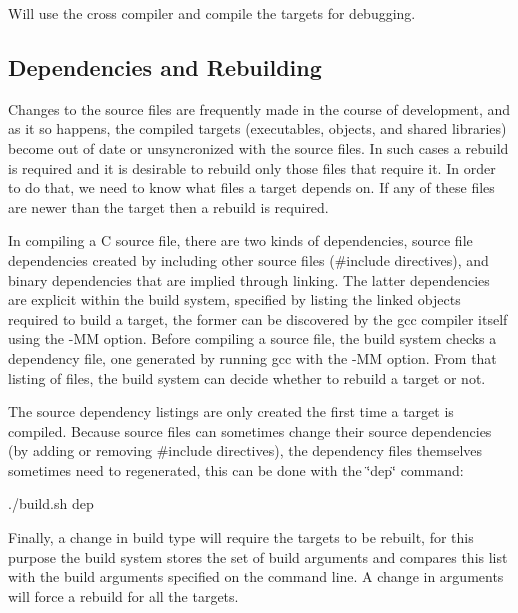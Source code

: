 Will use the cross compiler and compile the targets for debugging.

\subsection*{Dependencies and Rebuilding }

Changes to the source files are frequently made in the course of development, and as it so happens, the compiled targets (executables, objects, and shared libraries) become out of date or unsyncronized with the source files. In such cases a rebuild is required and it is desirable to rebuild only those files that require it. In order to do that, we need to know what files a target depends on. If any of these files are newer than the target then a rebuild is required.

In compiling a C source file, there are two kinds of dependencies, source file dependencies created by including other source files ({\ttfamily \#include} directives), and binary dependencies that are implied through linking. The latter dependencies are explicit within the build system, specified by listing the linked objects required to build a target, the former can be discovered by the gcc compiler itself using the {\ttfamily -\/\+MM} option. Before compiling a source file, the build system checks a dependency file, one generated by running gcc with the {\ttfamily -\/\+MM} option. From that listing of files, the build system can decide whether to rebuild a target or not.

The source dependency listings are only created the first time a target is compiled. Because source files can sometimes change their source dependencies (by adding or removing {\ttfamily \#include} directives), the dependency files themselves sometimes need to regenerated, this can be done with the \char`\"{}dep\char`\"{} command\+: \begin{DoxyVerb}./build.sh dep
\end{DoxyVerb}


Finally, a change in build type will require the targets to be rebuilt, for this purpose the build system stores the set of build arguments and compares this list with the build arguments specified on the command line. A change in arguments will force a rebuild for all the targets. 
